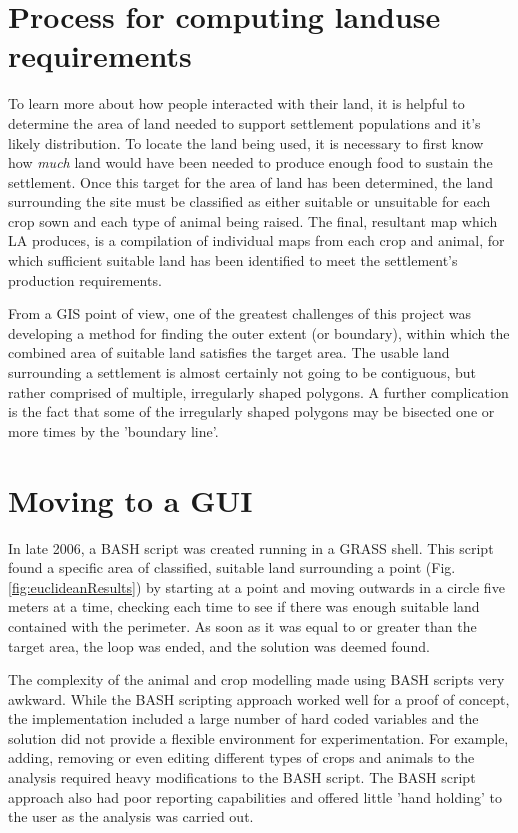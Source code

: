 \section{Process for computing landuse requirements} 

\label{sec:EarlyAttempts} 

To learn more about how people interacted with their land, it is
helpful to determine the area of land needed to support settlement
populations and it's likely distribution.  To locate the land being used, it is necessary
to first know how \textit{much} land would have been needed to produce enough food to
sustain the settlement.  Once this target for the area of land has been
determined, the land surrounding the site must be classified as either suitable
or unsuitable for each crop sown and each type of animal being raised.  The
final, resultant map which LA produces, is a compilation of individual maps from each crop and animal, for which sufficient suitable land has been identified to meet the settlement's production requirements.

From a GIS point of view, one of the greatest challenges of this project was
developing a method for finding the outer extent (or boundary), within which
the combined area of suitable land satisfies the target area.  The usable land
surrounding a settlement is almost certainly not going to be contiguous, but
rather comprised of multiple, irregularly shaped polygons. A further
complication is the fact that some of the irregularly shaped polygons may
be bisected one or more times by the 'boundary line'.


\section{Moving to a GUI} \label{GUI} 

In late 2006, a BASH script was created running in a GRASS shell. This script
found a specific area of classified, suitable land surrounding a point
(Fig.\ref{fig:euclideanResults})  by starting at a point and moving outwards in
a circle five meters at a time, checking each time to see if there was enough
suitable land contained with the perimeter.  As soon as it was equal to or
greater than the target area, the loop was ended, and the solution was deemed
found.
 
The complexity of the animal and crop modelling made using BASH scripts very
awkward.  While the BASH scripting approach worked well for a proof of concept,
the implementation included a large number of hard coded variables and the
solution did not provide a flexible environment for experimentation. For
example, adding, removing or even editing different types of crops and animals
to the analysis required heavy modifications to the BASH script.  The BASH
script approach also had poor reporting capabilities and offered
little 'hand holding' to the user as the analysis was carried out.

